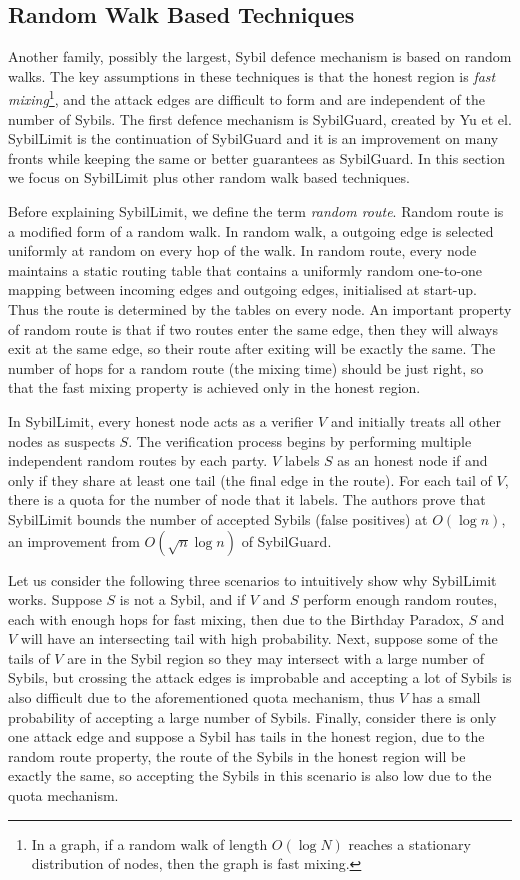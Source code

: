\subsection{Random Walk Based Techniques}\label{sec:random-walk}
Another family, possibly the largest, Sybil defence mechanism is based on random
walks. The key assumptions in these techniques is that the honest region is
\emph{fast mixing}\footnote{In a graph, if a random walk of length $O(\log{N})$
  reaches a stationary distribution of nodes, then the graph is fast mixing.},
and the attack edges are difficult to form and are independent of the number of
Sybils. The first defence mechanism is SybilGuard\cite{yu2006sybilguard},
created by Yu et el. SybilLimit\cite{yu2008sybillimit} is the continuation of
SybilGuard and it is an improvement on many fronts while keeping the same or
better guarantees as SybilGuard. In this section we focus on SybilLimit plus
other random walk based techniques.

Before explaining SybilLimit, we define the term \emph{random route}. Random
route is a modified form of a random walk. In random walk, a outgoing edge is
selected uniformly at random on every hop of the walk. In random route, every
node maintains a static routing table that contains a uniformly random
one-to-one mapping between incoming edges and outgoing edges, initialised at
start-up. Thus the route is determined by the tables on every node. An important
property of random route is that if two routes enter the same edge, then they
will always exit at the same edge, so their route after exiting will be exactly
the same. The number of hops for a random route (the mixing time) should be just
right, so that the fast mixing property is achieved only in the honest region.

In SybilLimit, every honest node acts as a verifier $V$ and initially treats all
other nodes as suspects $S$. The verification process begins by performing
multiple independent random routes by each party. $V$ labels $S$ as an honest
node if and only if they share at least one tail (the final edge in the route).
For each tail of $V$, there is a quota for the number of node that it labels.
The authors prove that SybilLimit bounds the number of accepted Sybils (false
positives) at $O(\log{n})$, an improvement from $O(\sqrt{n} \log{n})$ of
SybilGuard.

Let us consider the following three scenarios to intuitively show why SybilLimit
works. Suppose $S$ is not a Sybil, and if $V$ and $S$ perform enough random
routes, each with enough hops for fast mixing, then due to the Birthday Paradox,
$S$ and $V$ will have an intersecting tail with high probability. Next, suppose
some of the tails of $V$ are in the Sybil region so they may intersect with a
large number of Sybils, but crossing the attack edges is improbable and
accepting a lot of Sybils is also difficult due to the aforementioned quota
mechanism, thus $V$ has a small probability of accepting a large number of
Sybils. Finally, consider there is only one attack edge and suppose a Sybil has
tails in the honest region, due to the random route property, the route of the
Sybils in the honest region will be exactly the same, so accepting the Sybils in
this scenario is also low due to the quota mechanism.

